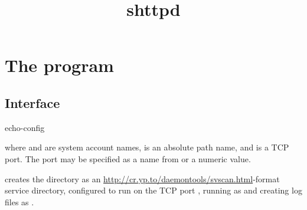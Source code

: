 \documentclass{book}
\title{shttpd}
\begin{document}
\section{The  program}

\subsection{Interface}
\begin{code}
  echo-config    
\end{code}
where  and  are system account names,
 is an absolute path name, and  is a TCP port.
The port may be specified as a name from  or a
numeric value.

 creates the directory  as an
\href{svscan}{http://cr.yp.to/daemontools/svscan.html}-format service
directory, configured to run  on the TCP port
, running  as  and creating log
files as .
\end{document}
